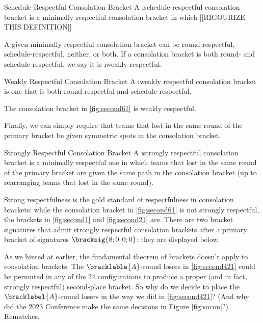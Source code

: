{    \begin{definition}{Schedule-Respectful Consolation Bracket}{}
        A \i{schedule-respectful} consolation bracket is a minimally respectful consolation bracket in which [[RIGOURIZE THIS DEFINITION]]
    \end{definition}

    A given minimally respectful consolation bracket can be round-respectful, schedule-respectful, neither, or both. If a consolation bracket is both round- and schedule-respectful, we say it is \i{weakly respectful}.

    \begin{definition}{Weakly Respectful Consolation Bracket}{}
        A \i{weakly respectful} consolation bracket is  one that is both round-respectful and schedule-respectful.
    \end{definition}

    The consolation bracket in \ref{fig:second61} is weakly respectful.


    Finally, we can simply require that teams that lost in the same round of the primary bracket be given symmetric spots in the consolation bracket.

    \begin{definition}{Strongly Respectful Consolation Bracket}{}
        A \i{strongly respectful} consolation bracket is a minimally respectful one in which teams that lost in the same round of the primary bracket are given the same path in the consolation bracket (up to rearranging teams that lost in the same round).
    \end{definition}

    Strong respectfulness is the gold standard of respectfulness in consolation brackets: while the consolation bracket in \ref{fig:second61} is not strongly respectful, the brackets in \ref{fig:second1} and \ref{fig:second21} are. There are two bracket signatures that admit strongly respectful consolation brackets after a primary bracket of signatures $\bracksig{8;0;0;0}$: they are displayed below.



    As we hinted at earlier, the fundamental theorem of brackets doesn't apply to consolation brackets. The $\bracklable{A}$-round losers in \ref{fig:second421} could be permuted in any of the 24 configurations to produce a proper (and in fact, strongly respectful) second-place bracket. So why do we decide to place the $\bracklabel{A}$-round losers in the way we did in \ref{fig:second421}? (And why did the 2023 Conference make the same decisions in Figure \ref{fig:socon}?) Rematches.

}
